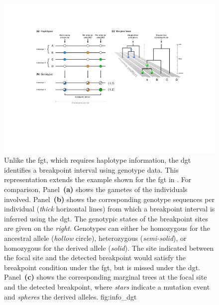

\begin{figure}[!htb]
\centering
\includegraphics[width=\textwidth]{./img/ch3/info_dgt_new}
{Unlike the \gls{fgt}, which requires haplotype information, the \gls{dgt} identifies a breakpoint interval using genotype data.
This representation extends the example shown for the \gls{fgt} in .
For comparison, Panel~\textbf{(a)} shows the  gametes of the  individuals involved.
Panel~\textbf{(b)} shows the  corresponding genotype sequences per individual (\emph{thick} horizontal lines) from which a breakpoint interval is inferred using the \gls{dgt}.
The genotypic states of the breakpoint sites are given on the \emph{right}.
Genotypes can either be homozygous for the ancestral allele (\emph{hollow} circle), heterozygous (\emph{semi-solid}), or homozygous for the derived allele (\emph{solid}).
The site indicated between the focal site and the detected breakpoint would satisfy the breakpoint condition under the \gls{fgt}, but is missed under the \gls{dgt}.
Panel~\textbf{(c)} shows the corresponding marginal trees at the focal site and the detected breakpoint, where \emph{stars} indicate a mutation event and \emph{spheres} the derived alleles.\CorrectLabel}
{fig:info_dgt}
\end{figure}
